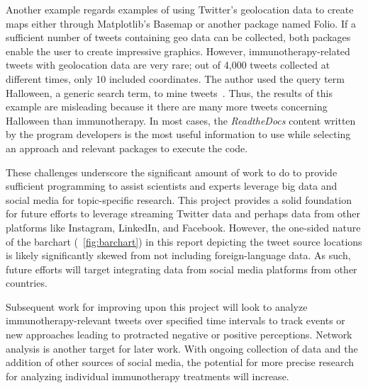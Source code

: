 Another example regards examples of using Twitter's geolocation data
to create maps either through Matplotlib's Basemap or another package
named Folio. If a sufficient number of tweets containing geo data can
be collected, both packages enable the user to create impressive
graphics.  However, immunotherapy-related tweets with geolocation data
are very rare; out of 4,000 tweets collected at different times, only
10 included coordinates.  The author used the query term Halloween, a
generic search term, to mine tweets~\cite{ianbroad2014}.  Thus, the
results of this example are misleading because it there are many more
tweets concerning Halloween than immunotherapy.  In most cases, the
\emph{ReadtheDocs} content written by the program developers is the
most useful information to use while selecting an approach and
relevant packages to execute the code.

These challenges underscore the significant amount of work to do to
provide sufficient programming to assist scientists and experts
leverage big data and social media for topic-specific research.  This
project provides a solid foundation for future efforts to leverage
streaming Twitter data and perhaps data from other platforms like
Instagram, LinkedIn, and Facebook.  However, the one-sided nature of
the barchart (~\ref{fig:barchart}) in this report depicting the tweet
source locations is likely significantly skewed from not including
foreign-language data.  As such, future efforts will target
integrating data from social media platforms from other countries.

Subsequent work for improving upon this project will look to analyze
immunotherapy-relevant tweets over specified time intervals to track
events or new approaches leading to protracted negative or positive
perceptions.  Network analysis is another target for later work.  With
ongoing collection of data and the addition of other sources of social
media, the potential for more precise research for analyzing
individual immunotherapy treatments will increase.



 

